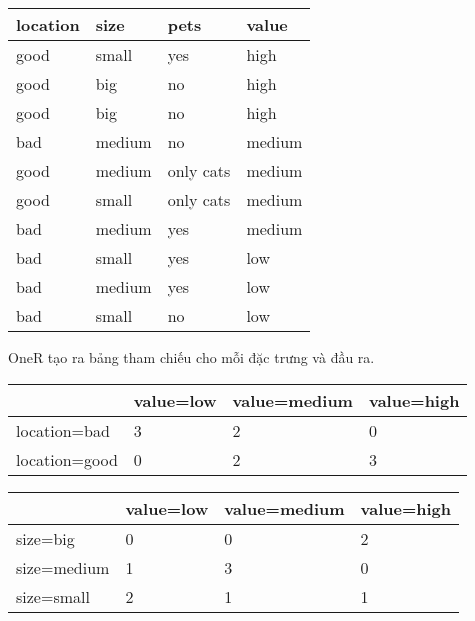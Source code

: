\begin{table*}[hbt!]
\centering
\begin{tabular}{|l|l|l|l|}
\hline
\textbf{location} & \textbf{size}   & \textbf{pets}      & \textbf{value}  \\ \hline
good     & small  & yes       & high   \\ \hline
good     & big    & no        & high   \\ \hline
good     & big    & no        & high   \\ \hline
bad      & medium & no        & medium \\ \hline
good     & medium & only cats & medium \\ \hline
good     & small  & only cats & medium \\ \hline
bad      & medium & yes       & medium \\ \hline
bad      & small  & yes       & low    \\ \hline
bad      & medium & yes       & low    \\ \hline
bad      & small  & no        & low    \\ \hline
\end{tabular}
\end{table*}

OneR tạo ra bảng tham chiếu cho mỗi đặc trưng và đầu ra.

\begin{table*}[hbt!]
\centering
\begin{tabular}{|l|l|l|l|}
\hline
              & \textbf{value=low} & \textbf{value=medium} & \textbf{value=high} \\ \hline
location=bad  & 3         & 2            & 0          \\ \hline
location=good & 0         & 2            & 3          \\ \hline
\end{tabular}
\end{table*}

\begin{table*}[hbt!]
\centering
\begin{tabular}{|l|l|l|l|}
\hline
            & \textbf{value=low} & \textbf{value=medium} & \textbf{value=high} \\ \hline
size=big    & 0                  & 0                     & 2                   \\ \hline
size=medium & 1                  & 3                     & 0                   \\ \hline
size=small  & 2                  & 1                     & 1                   \\ \hline
\end{tabular}
\end{table*}

